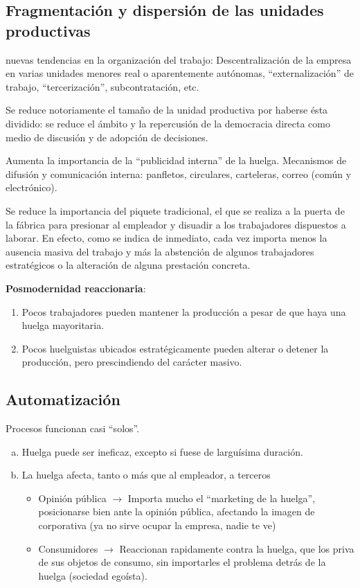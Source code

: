 \documentclass[spanish,12pt,a4paper,titlepage]{report}
\begin{document}
\subsection{Fragmentación y dispersión de las unidades productivas}

nuevas tendencias en la organización del trabajo: Descentralización de la empresa en varias unidades menores real o aparentemente autónomas, ``externalización'' de trabajo, ``tercerización'', subcontratación, etc.

Se reduce notoriamente el tamaño de la unidad productiva por haberse ésta dividido: se reduce el ámbito y la repercusión de la democracia directa como medio de discusión y de adopción de decisiones. 

Aumenta la importancia de la ``publicidad interna'' de la huelga. Mecanismos de difusión y comunicación interna: panfletos, circulares, carteleras, correo (común y electrónico).

Se reduce la importancia del piquete tradicional, el que se realiza a la puerta de la fábrica para presionar al empleador y disuadir a los trabajadores dispuestos a laborar. En efecto, como se indica de inmediato, cada vez importa menos la ausencia masiva del trabajo y más la abstención de algunos trabajadores estratégicos o la alteración de alguna prestación concreta. 

\textbf{Posmodernidad reaccionaria}:
\begin{enumerate}
\item Pocos trabajadores pueden mantener la producción a pesar de que haya una huelga mayoritaria.
\item Pocos huelguistas ubicados estratégicamente pueden alterar o detener la producción, pero prescindiendo del carácter masivo.
\end{enumerate}

\subsection{Automatización}

Procesos funcionan casi ``solos''.
\begin{enumerate}[(a)]
\item Huelga puede ser ineficaz, excepto si fuese de larguísima duración.
\item La huelga afecta, tanto o más que al empleador, a terceros
  \begin{itemize}
  \item Opinión pública $\rightarrow$ Importa mucho el ``marketing de la huelga'', posicionarse bien ante la opinión pública, afectando la imagen de corporativa (ya no sirve ocupar la empresa, nadie te ve)
  \item Consumidores $\rightarrow$ Reaccionan rapidamente contra la huelga, que los priva de sus objetos de consumo, sin importarles el problema detrás de la huelga (sociedad egoísta).
  \end{itemize}
\end{enumerate}
\end{document}
